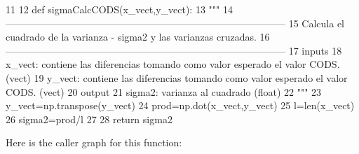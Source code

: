 \begin{DoxyCode}
11 
12 def sigmaCalcCODS(x_vect,y_vect):
13     """
14    
       --------------------------------------------------------------------------------------
15     Calcula el cuadrado de la varianza - sigma2 y las varianzas cruzadas.
16    
       --------------------------------------------------------------------------------------
17     inputs
18         x_vect: contiene las diferencias tomando como valor esperado el valor
       CODS. (vect)
19         y_vect: contiene las diferencias tomando como valor esperado el valor
       CODS. (vect)
20     output
21         sigma2: varianza al cuadrado (float)
22     """
23     y_vect=np.transpose(y_vect)
24     prod=np.dot(x_vect,y_vect)
25     l=len(x_vect)
26     sigma2=prod/l
27     
28     return sigma2

\end{DoxyCode}


\-Here is the caller graph for this function\-:


